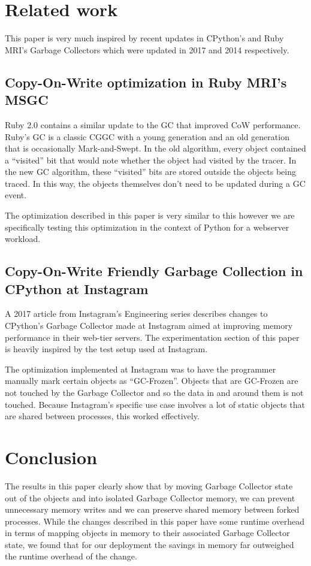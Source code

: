 \documentclass{article}
\begin{document}
\section{Related work}\label{sec:relatedwork}

This paper is very much inspired by recent updates in CPython's and Ruby MRI's Garbage Collectors which were updated in 2017 and 2014 respectively.  

\subsection{Copy-On-Write optimization in Ruby MRI's MSGC}

Ruby 2.0 contains a similar update to the GC that improved CoW performance.  Ruby's GC is a classic CGGC with a young generation and an old generation that is occasionally Mark-and-Swept.  In the old algorithm, every object contained a ``visited'' bit that would note whether the object had visited by the tracer.  In the new GC algorithm, these ``visited'' bits are stored outside the objects being traced.  In this way, the objects themselves don't need to be updated during a GC event.  

The optimization described in this paper is very similar to this however we are specifically testing this optimization in the context of Python for a webserver workload.  

\subsection{Copy-On-Write Friendly Garbage Collection in CPython at Instagram}

A 2017 article from Instagram's Engineering series describes changes to CPython's Garbage Collector made at Instagram aimed at improving memory performance in their web-tier servers.  The experimentation section of this paper is heavily inspired by the test setup used at Instagram.

The optimization implemented at Instagram was to have the programmer manually mark certain objects as ``GC-Frozen''.  Objects that are GC-Frozen are not touched by the Garbage Collector and so the data in and around them is not touched.  Because Instagram's specific use case involves a lot of static objects that are shared between processes, this worked effectively.  

\section{Conclusion}

The results in this paper clearly show that by moving Garbage Collector state out of the objects and into isolated Garbage Collector memory, we can prevent unnecessary memory writes and we can preserve shared memory between forked processes.  While the changes described in this paper have some runtime overhead in terms of mapping objects in memory to their associated Garbage Collector state, we found that for our deployment the savings in memory far outweighed the runtime overhead of the change. 

\newpage
\onecolumn
\nocite{*}


\end{document}
